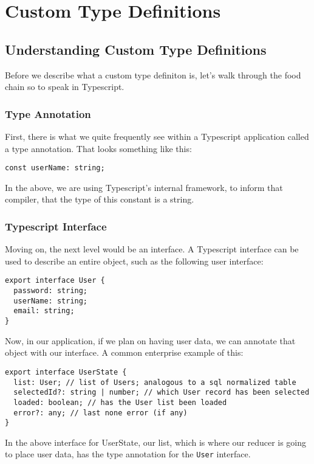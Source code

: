 \chapter{ Custom Type Definitions }

\section{Understanding Custom Type Definitions}
Before we describe what a custom type definiton is, let's walk through the food chain so to speak in Typescript. 

\subsection{Type Annotation}
First, there is what we quite frequently see within a Typescript application called a type annotation. That looks something like this: 
\begin{verbatim}
const userName: string;  
\end{verbatim}

In the above, we are using Typescript's internal framework, to inform that compiler, that the type of this constant is a string. 

\subsection{Typescript Interface}
Moving on, the next level would be an interface. A Typescript interface can be used to describe an entire object, such as the following user interface: 
\begin{lstlisting}[caption=Typescript User Interface]
export interface User {
  password: string;
  userName: string;
  email: string;
}
\end{lstlisting}

Now, in our application, if we plan on having user data, we can annotate that object with our interface. A common enterprise example of this: 
\begin{lstlisting}[caption=user.reducer.ts]
export interface UserState {
  list: User; // list of Users; analogous to a sql normalized table
  selectedId?: string | number; // which User record has been selected
  loaded: boolean; // has the User list been loaded
  error?: any; // last none error (if any)
}  
\end{lstlisting}

In the above interface for UserState, our list, which is where our reducer is going to place user data, has the type annotation for the \lstinline{User} interface.

